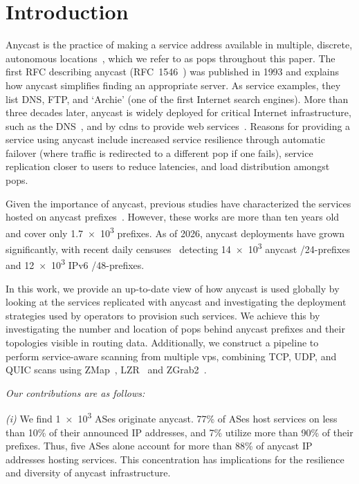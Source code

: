 
\section{Introduction}\label{sec:introduction}
Anycast is the practice of making a service address available in
multiple, discrete, autonomous locations~\cite{rfc4786},
which we refer to as \glspl{pop} throughout this paper.
%
The first RFC describing anycast (RFC~1546~\cite{rfc1546}) was published in 1993 and explains how anycast simplifies finding an appropriate server.
As service examples, they list DNS, FTP, and `Archie' (one of the first Internet search engines).
%
More than three decades later, anycast is widely deployed for critical Internet infrastructure, such as the DNS~\cite{dns-anycast},
and by \glspl{cdn} to provide web services~\cite{CicaleseEtAl_CharacterizingIPv4Anycast_2015, GiordanoEtAl_FirstCharacterizationAnycast_}.
%
Reasons for providing a service using anycast include
increased service resilience through automatic failover
(where traffic is redirected to a different \gls{pop} if one fails),
service replication closer to users to reduce latencies,
and load distribution amongst \glspl{pop}.

Given the importance of anycast, previous studies have characterized the services hosted on anycast prefixes~\cite{CicaleseEtAl_CharacterizingIPv4Anycast_2015, GiordanoEtAl_FirstCharacterizationAnycast_}.
However, these works are more than ten years old
and cover only \num{1.7e3} prefixes.
As of 2026, anycast deployments have grown significantly, with recent daily censuses~\cite{Hendriks_LACeS_An_Open_2025} detecting \num{14e3} anycast /24-prefixes
and \num{12e3} IPv6 /48-prefixes.

In this work, we provide an up-to-date view of how anycast is used globally
by looking at the services replicated with anycast
and investigating the deployment strategies used by operators to provision such services.
%
We achieve this by investigating the number and location of \glspl{pop} behind anycast prefixes and their topologies visible in routing data.
%
Additionally, we construct a pipeline to perform service-aware scanning from multiple \glspl{vp},
combining TCP, UDP, and QUIC scans using ZMap~\cite{ZMapInternetScanner2013}, LZR~\cite{lzr} and ZGrab2~\cite{censys15}.

\noindent{}\textit{Our contributions are as follows:}

\textit{(i)}
We find \num{1e3} ASes originate anycast.
77\% of ASes host services on less than 10\% of their announced IP addresses, and 7\% utilize more than 90\% of their prefixes.
Thus, five ASes alone account for more than 88\% of anycast IP addresses hosting services.
%
This concentration has implications for the resilience and diversity of anycast infrastructure.

